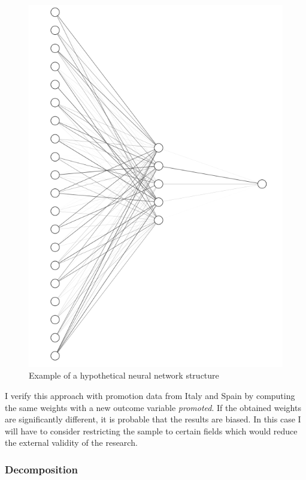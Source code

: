 \documentclass[10pt]{report}
\begin{document}
\begin{figure}[htbp]
    \centering
    \includegraphics[scale=.4, angle =90]{proposal/nn.png}
    \caption{Example of a hypothetical neural network structure}
    \label{fig:nn_example}
\end{figure}


I verify this approach with promotion data from Italy and Spain \parencite[]{Bagues2017} by computing the same weights with a new outcome variable \textit{promoted}. If the obtained weights are significantly different, it is probable that the results are biased. In this case I will have to consider restricting the sample to certain fields which would reduce the external validity of the research.

\subsubsection*{Decomposition}
\end{document}

